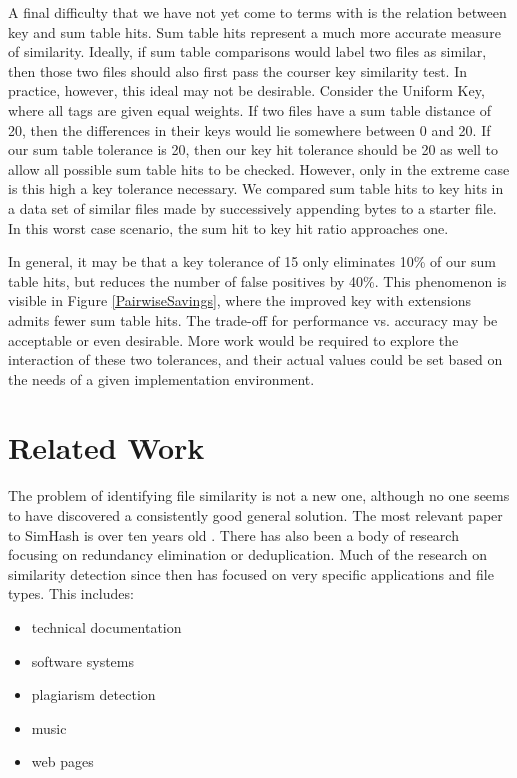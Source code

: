 \documentclass[10pt, twocolumn]{article}
\begin{document}
A final difficulty that we have not yet come to terms with is the relation between key and sum table hits.  Sum table hits represent a much more accurate measure of similarity.  Ideally, if sum table comparisons would label two files as similar, then those two files should also first pass the courser key similarity test.  In practice, however, this ideal may not be desirable.  Consider the Uniform Key, where all tags are given equal weights.  If two files have a sum table distance of 20, then the differences in their keys would lie somewhere between 0 and 20. If our sum table tolerance is 20, then our key hit tolerance should be 20 as well to allow all possible sum table hits to be checked.  However, only in the extreme case is this high a key tolerance necessary.
We compared sum table hits to key hits in a data set of similar files made by successively appending bytes to a starter file. In this worst case scenario, the sum hit to key hit ratio approaches one. 

In general, it may be that a key tolerance of 15 only eliminates 10\% of our sum table hits, but reduces the number of false positives by 40\%.  This phenomenon is visible in Figure \ref{PairwiseSavings}, where the improved key with extensions admits fewer sum table hits.  The trade-off for performance vs. accuracy may be acceptable or even desirable.  More work would be required to explore the interaction of these two tolerances, and their actual values could be set based on the needs of a given implementation environment.

\section{Related Work}

The problem of identifying file similarity is not a new one, although no one seems to have discovered a consistently good general solution. The most relevant paper to SimHash is over ten years old \cite{manber}. There has also been a body of research focusing on redundancy elimination or deduplication. Much of the research on similarity detection since then has focused on very specific applications and file types. This includes:
\begin{itemize}
\item technical documentation \cite{hpDocRepositories} 
\item software systems \cite{sourcecode} 
\item plagiarism detection \cite{hoad} \cite{bernstein}
\item music \cite{music}
\item web pages \cite{buttler}
\end{itemize}
\end{document}
